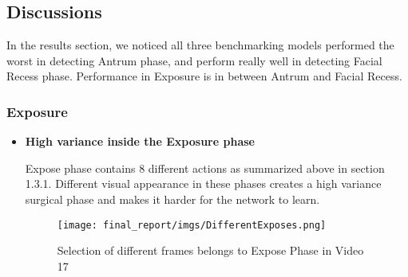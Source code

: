 \documentclass[11pt]{article} \usepackage[top=1in, bottom=1in, left=1in, right=1in]{geometry}
\begin{document}
\subsection{Discussions}
In the results section, we noticed all three benchmarking models performed the worst in detecting Antrum phase, and perform really well in detecting Facial Recess phase. Performance in Exposure is in between Antrum and Facial Recess. 
\subsubsection{Exposure}
\begin{itemize}
    \item \textbf{High variance inside the Exposure phase}
    
    Expose phase contains 8 different actions as summarized above in section 1.3.1. Different visual appearance in these phases creates a high variance surgical phase and makes it harder for the network to learn. 
    \begin{figure}[H]
      \texttt{[image: final\_report/imgs/DifferentExposes.png]}
      \centering
      \caption{Selection of different frames belongs to Expose Phase in Video 17}
      \label{fig:3framesAntrum}
    \end{figure}
\end{itemize}
\end{document}
